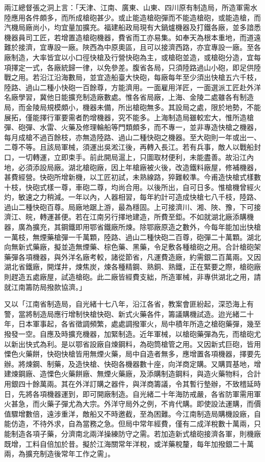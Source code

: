 \begin{pinyinscope}
兩江總督張之洞上言：「天津、江南、廣東、山東、四川原有制造局，所造軍需水陸應用各件頗多，而所成槍砲甚少。或止能造槍砲彈而不能造槍砲，或能造槍，而汽機局廠尚小，均宜量加擴充。福建船政局現有大鍋爐機器及打鐵各廠，並多諳悉機器員司工匠，若增置造槍砲機器，費省而工亦易集。如奉天為根本重地，而道遠難於接濟，宜專設一廠。陜西為中原奧區，且可以接濟西路，亦宜專設一廠。至各廠制造，大率皆宜以小口徑快槍及行營快砲為主，或槍砲並造，或槍砲分造，宜每項擇定一式，各廠統歸一律，以免參差。腹省各局，只須陸路過山小砲，即足供陸戰之用。若沿江沿海數局，並宜造船臺大快砲，每廠每年至少須出快槍五六千枝，陸路、過山二種小快砲一百餘尊，方能濟用。一面雇用洋匠，一面選派工匠赴外洋名廠學習，冀他日能擴充制造廠數處。惟各省局廠，上海、金陵二處雖各有制造局，而金陵局規模頗小，機器未備，所出槍砲無多。其設局之處，限於地勢，不能展拓，僅能擇行軍要需者酌增機器，究不能多。上海制造局雖較宏大，惟所造槍彈、砲彈、水雷、火藥及修理輪船等門類頗多，而不專一，並非專造快槍之機器，每月成槍不過百餘枝，亦無造陸路、過山二種快砲之機器。至大砲則一年或出一、二尊不等。且該局軍械，須運出吳淞江後，再轉入長江。若有兵事，敵人以戰船封口，一切轉運，立即束手。前此開局滬上，只圖取材便利，未能盡善。故沿江內地，必須添設局廠。湖北槍砲廠，因上年槍廠被火後，改造鐵料廠屋，修補機器，甚費經營。快砲所增新機，以工匠初試，未熟線路，猝難較準。今甫造快槍式樣數十枝，快砲式樣一尊，車砲二尊，均尚合用。以後所出，自可日多。惟槍機曾經火灼，敏速之力稍減。一年以內，人器相習，每年約計可造成快槍七八千枝，陸路、過山二種快砲百尊。局廠地踞上游，最為穩固。上可接濟川、湘、陜、豫，下可接濟江、皖，轉運甚便。若在江南另行擇地建造，所費至鉅。不如就湖北廠添購機器，廣為擴充，其鋼鐵即用鄂省鐵廠所煉。除鄂廠原造之數外，今每年能加出快槍一萬枝，無煙藥槍彈一千萬顆，陸路、過山二種快砲二百尊，砲彈二十萬顆。湖北向無新式藥廠，擬並造無煙藥、棕色藥、黑藥，令足敷各種槍砲之用。合計槍砲架藥彈各項機器，與外洋名廠考較，諸從節省，凡運費造廠，約需銀二百萬兩。又因湖北省鐵廠，開煤井，煉焦炭，煉各種精鋼、熟銅、熟鐵，正在緊要之際，槍砲廠則趕造五處廠屋，試造槍砲。此二廠皆經費支絀，所造軍械，非專供湖北之用，請就江南籌防局撥款協濟。」

又以「江南省制造局，自光緒十七八年，沿江各省，教案會匪紛起，深恐海上有警，當將制造局應行增制快槍快砲、新式火藥各件，籌議購機試造。迨光緒二十年，日本軍事起，各省徵調頻繁，處處調撥軍火，局中積年所造之槍砲藥彈，幾至撥發一空。自應及時擴充機器，加緊制造。近年軍械，以槍砲藥彈為先，而槍砲尤以新出快式為利。是以鄂省設廠自煉鋼料，為砲筒槍管之用。又因新式巨砲，皆用慄色火藥餅，快砲快槍皆用無煙火藥，局中自造者無多，應增置各項機器，擇要先辦。將煉鋼、制藥，及造快槍、快砲各機器數十座，向洋商定購。又購買基地，增建煉鋼廠、造慄色火藥餅廠、無煙火藥廠，及添購制造鋼料，與造火藥物料，合計用銀四十餘萬兩。其在外洋訂購之器件，與洋商籌議，令其暫行墊辦，不致稽延時日，先將各項機器運到，即可開廠制造。自光緒二十年海防戒嚴，各省防軍需用軍火甚急，而火藥子彈尤為大宗。外洋守局外之例，不肯代購。即使設法運購，而價值驟增數倍，遠涉重洋，敵船又不時邀截，至為困難。今江南制造局購機設廠，自能仿造，不待外求，自為當務之急。但局中常年經費，僅有二成洋稅數十萬兩，只能制造各項子藥，分濟南北兩洋操練防守之需。若加造新式槍砲接濟各軍，則機廠既增，工料自倍加於昔。擬於江海關常年洋稅，或洋藥稅釐，每年加撥銀二十萬兩，為擴充制造後常年工作之需」。


\end{pinyinscope}
